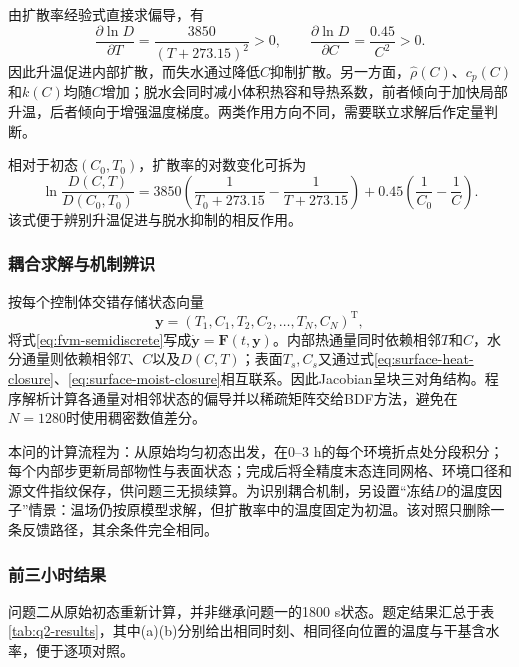 由扩散率经验式直接求偏导，有
\begin{equation}
\frac{\partial\ln D}{\partial T}
=\frac{3850}{(T+273.15)^2}>0,
\qquad
\frac{\partial\ln D}{\partial C}=\frac{0.45}{C^2}>0.
\label{eq:D-partials}
\end{equation}
因此升温促进内部扩散，而失水通过降低$C$抑制扩散。另一方面，$\hat\rho(C)$、$c_p(C)$和$k(C)$均随$C$增加；脱水会同时减小体积热容和导热系数，前者倾向于加快局部升温，后者倾向于增强温度梯度。两类作用方向不同，需要联立求解后作定量判断。

相对于初态$(C_0,T_0)$，扩散率的对数变化可拆为
\begin{equation}
\ln\frac{D(C,T)}{D(C_0,T_0)}=
3850\left(\frac{1}{T_0+273.15}-\frac{1}{T+273.15}\right)
+0.45\left(\frac{1}{C_0}-\frac{1}{C}\right).
\label{eq:D-decomposition}
\end{equation}
该式便于辨别升温促进与脱水抑制的相反作用。

\subsubsection{耦合求解与机制辨识}

按每个控制体交错存储状态向量
\begin{equation}
\bm y=(T_1,C_1,T_2,C_2,\ldots,T_N,C_N)^{\mathrm T},
\end{equation}
将式\eqref{eq:fvm-semidiscrete}写成$\dot{\bm y}=\bm F(t,\bm y)$。内部热通量同时依赖相邻$T$和$C$，水分通量则依赖相邻$T$、$C$以及$D(C,T)$；表面$T_s,C_s$又通过式\eqref{eq:surface-heat-closure}、\eqref{eq:surface-moist-closure}相互联系。因此Jacobian呈块三对角结构。程序解析计算各通量对相邻状态的偏导并以稀疏矩阵交给BDF方法，避免在$N=1280$时使用稠密数值差分。

本问的计算流程为：从原始均匀初态出发，在0--3 h的每个环境折点处分段积分；每个内部步更新局部物性与表面状态；完成后将全精度末态连同网格、环境口径和源文件指纹保存，供问题三无损续算。为识别耦合机制，另设置“冻结$D$的温度因子”情景：温场仍按原模型求解，但扩散率中的温度固定为初温。该对照只删除一条反馈路径，其余条件完全相同。

\subsubsection{前三小时结果}

问题二从原始初态重新计算，并非继承问题一的1800 s状态。题定结果汇总于表\ref{tab:q2-results}，其中(a)(b)分别给出相同时刻、相同径向位置的温度与干基含水率，便于逐项对照。



